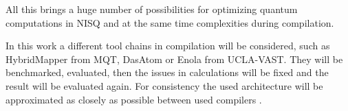 All this brings a huge number of possibilities for optimizing quantum computations in \ac{NISQ}
and at the same time complexities during compilation.

In this work a different tool chains in compilation will be considered, such as HybridMapper from \ac{MQT}, 
DasAtom or Enola from \ac{UCLA-VAST}.
They will be benchmarked, evaluated, then the issues in calculations will be fixed and the result will be evaluated again.
For consistency the used architecture will be approximated as closely as possible between used compilers
\parencite{Henriet_2020, Schmid_2024_NeutralAtomBasics}.